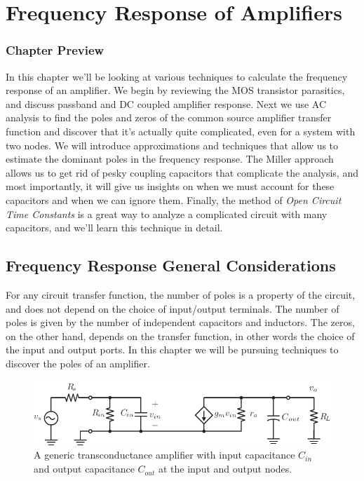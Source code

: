 
\chapter{Frequency Response of Amplifiers}



\graphicspath{{./figs_freq_resp/}}



\subsection{Chapter Preview}

In this chapter we'll be looking at various techniques to calculate the frequency response of an amplifier.  We begin by reviewing the MOS transistor parasitics, and discuss passband and DC coupled amplifier response.  Next we use AC analysis to find the poles and zeros of the common source amplifier transfer function and discover that it's actually quite complicated, even for a system with two nodes.  We will introduce approximations and techniques that allow us to estimate the dominant poles in the frequency response.  The Miller approach allows us to get rid of pesky coupling capacitors that complicate the analysis, and most importantly, it will give us insights on when we must account for these capacitors and when we can ignore them.  Finally, the method of \emph{Open Circuit Time Constants} is a great way to analyze a complicated circuit with many capacitors, and we'll learn this technique in detail.  
 
\section{Frequency Response General Considerations}

For any circuit transfer function, the number of poles is a property of the circuit, and does not depend on the choice of input/output terminals.  The number of poles is given by the number of independent capacitors and inductors.  The zeros, on the other hand, depends on the transfer function, in other words the choice of the input and output ports.  In this chapter we will be pursuing techniques to discover the poles of an amplifier.  

\begin{figure}[tb]
\begin{center}
\includegraphics[scale=1]{amp_two_poles}
\end{center}
\caption{A generic transconductance amplifier with input capacitance $C_{in}$ and output capacitance $C_{out}$ at the input and output nodes.} \label{fig:amp_two_poles_indep}
\end{figure}

